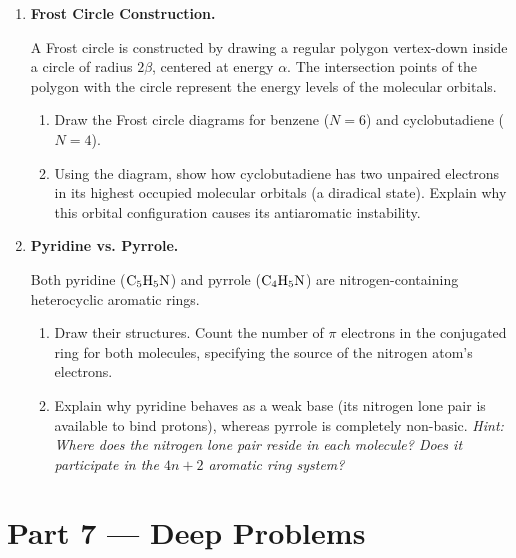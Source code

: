 \documentclass[12pt, a4paper]{book}
\begin{document}
\begin{problembox}
\begin{enumerate}[label=\textbf{P\arabic*.}]
  \item \textbf{Frost Circle Construction.}
  
        A Frost circle is constructed by drawing a regular polygon vertex-down inside a circle of radius $2\beta$, centered at energy $\alpha$. The intersection points of the polygon with the circle represent the energy levels of the molecular orbitals.
        \begin{enumerate}[label=(\alph*)]
          \item Draw the Frost circle diagrams for benzene ($N=6$) and cyclobutadiene ($N=4$).
          \item Using the diagram, show how cyclobutadiene has two unpaired electrons in its highest occupied molecular orbitals (a diradical state). Explain why this orbital configuration causes its antiaromatic instability.
        \end{enumerate}

  \item \textbf{Pyridine vs. Pyrrole.}
  
        Both pyridine ($\ce{C5H5N}$) and pyrrole ($\ce{C4H5N}$) are nitrogen-containing heterocyclic aromatic rings.
        \begin{enumerate}[label=(\alph*)]
          \item Draw their structures. Count the number of $\pi$ electrons in the conjugated ring for both molecules, specifying the source of the nitrogen atom's electrons.
          \item Explain why pyridine behaves as a weak base (its nitrogen lone pair is available to bind protons), whereas pyrrole is completely non-basic. \textit{Hint: Where does the nitrogen lone pair reside in each molecule? Does it participate in the $4n+2$ aromatic ring system?}
        \end{enumerate}
\end{enumerate}
\end{problembox}

\newpage

\section{Part 7 --- Deep Problems}
\end{document}
